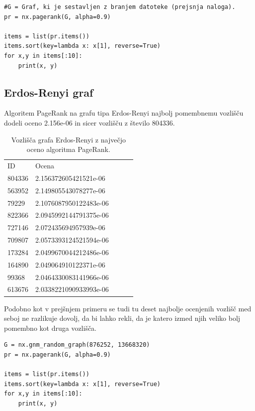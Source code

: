 \documentclass[a4paper,11pt]{article}
\begin{document}
\begin{lstlisting}
#G = Graf, ki je sestavljen z branjem datoteke (prejsnja naloga).
pr = nx.pagerank(G, alpha=0.9)

items = list(pr.items())
items.sort(key=lambda x: x[1], reverse=True)
for x,y in items[:10]:
    print(x, y)
\end{lstlisting}

\subsection{Erdos-Renyi graf}

Algoritem PageRank na grafu tipa Erdos-Renyi najbolj pomembnemu vozlišču dodeli oceno 2.156e-06
 in sicer vozlišču z število 804336.

\begin{table}[]
\centering
\caption{Vozlišča grafa Erdos-Renyi z največjo oceno algoritma PageRank.}
\label{my-label3}
\begin{tabular}{|l|l|lll}
\cline{1-2}
ID &  Ocena &  &  &  \\ \cline{1-2}
 
 
 804336& 2.156372605421521e-06&  &  &  \\ \cline{1-2}
 563952& 2.149805543078277e-06&  &  &  \\ \cline{1-2}
 79229& 2.1076087950122483e-06&  &  &  \\ \cline{1-2}
 822366& 2.0945992144791375e-06&  &  &  \\ \cline{1-2}
 727146& 2.072435694957939e-06&  &  &  \\ \cline{1-2}
 709807& 2.0573393124521594e-06&  &  &  \\ \cline{1-2}
 173284& 2.0499670044212486e-06&  &  &  \\ \cline{1-2}
 164890& 2.049064910122371e-06&  &  &  \\ \cline{1-2}
 99368& 2.0464330083141966e-06&  &  &  \\ \cline{1-2}
 613676& 2.0338221090933993e-06&  &  &  \\ \cline{1-2}
 
\end{tabular}
\end{table}

Podobno kot v prejšnjem primeru se tudi tu deset najbolje ocenjenih vozlišč med seboj ne razlikuje dovolj, da bi lahko rekli, da je katero izmed njih veliko bolj pomembno kot druga vozlišča.

\begin{lstlisting}
G = nx.gnm_random_graph(876252, 13668320)
pr = nx.pagerank(G, alpha=0.9)

items = list(pr.items())
items.sort(key=lambda x: x[1], reverse=True)
for x,y in items[:10]:
    print(x, y)
\end{lstlisting}
\end{document}
